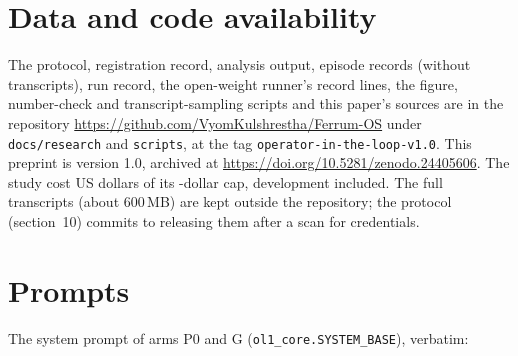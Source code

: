 \documentclass[sigconf]{acmart}
\begin{document}
\section*{Data and code availability}

The protocol, registration record, analysis output, episode records (without transcripts), run record,
the open-weight runner's record lines, the figure, number-check and transcript-sampling scripts and this
paper's sources are in the repository \url{https://github.com/VyomKulshrestha/Ferrum-OS} under
\texttt{docs/research} and \texttt{scripts}, at the tag \texttt{operator-in-the-loop-v1.0}. This preprint
is version 1.0, archived at \url{https://doi.org/10.5281/zenodo.24405606}. The study cost \VRunTotal{} US dollars of its \VRunCapTotal{}-dollar
cap, development included. The full transcripts (about 600\,MB) are kept outside the repository; the
protocol (section~10) commits to releasing them after a scan for credentials.




\appendix

\section{Prompts}
\label{app:prompts}

The system prompt of arms P0 and G (\texttt{ol1\_core.SYSTEM\_BASE}), verbatim:
\end{document}

